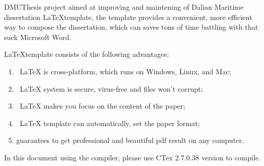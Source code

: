 \begin{abstractEn}
DMUThesis project aimed at improving and maintening of Dalian Maritime dissertation \LaTeX template, the template provides a convenient, more efficient way to compose the dissertation, which can saves tons of time battling with that suck Microsoft Word.

\LaTeX template consists of the following advantages:
\begin{enumerate}
\item \ LaTeX is cross-platform, which runs on Windows, Linux, and Mac;
\item \ LaTeX system is secure, virus-free and files won't corrupt;
\item \ LaTeX makes you focus on the content of the paper;
\item \ LaTeX template can automatically, set the paper format;
\item guarantees to get professional and  beautiful pdf result on any computer.
\end{enumerate}

In this document using the \XeLaTeX compiler, please use CTex 2.7.0.38 version to compile.
\end{abstractEn}
